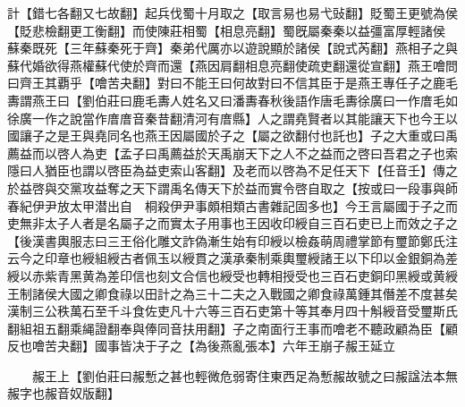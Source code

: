 計【錯七各翻又七故翻】起兵伐蜀十月取之【取言易也易弋䜴翻】貶蜀王更號為侯【貶悲檢翻更工衡翻】而使陳莊相蜀【相息亮翻】蜀旣屬秦秦以益彊富厚輕諸侯　蘇秦既死【三年蘇秦死于齊】秦弟代厲亦以遊說顯於諸侯【說式芮翻】燕相子之與蘇代婚欲得燕權蘇代使於齊而還【燕因肩翻相息亮翻使疏吏翻還從宣翻】燕王噲問曰齊王其覇乎【噲苦夬翻】對曰不能王曰何故對曰不信其臣于是燕王專任子之鹿毛夀謂燕王曰【劉伯莊曰鹿毛夀人姓名又曰潘夀春秋後語作唐毛夀徐廣曰一作庴毛如徐廣一作之說當作庴庴音秦昔翻清河有庴縣】人之謂堯賢者以其能讓天下也今王以國讓子之是王與堯同名也燕王因屬國於子之【屬之欲翻付也託也】子之大重或曰禹薦益而以啓人為吏【孟子曰禹薦益於天禹崩天下之人不之益而之啓曰吾君之子也索隱曰人猶臣也謂以啓臣為益吏索山客翻】及老而以啓為不足任天下【任音壬】傳之於益啓與交黨攻益奪之天下謂禹名傳天下於益而實令啓自取之【按或曰一段事與師春紀伊尹放太甲潜出自　桐殺伊尹事頗相類古書雜記固多也】今王言屬國于子之而吏無非太子人者是名屬子之而實太子用事也王因收印綬自三百石吏已上而效之子之【後漢書輿服志曰三王俗化雕文詐偽漸生始有印綬以檢姦萌周禮掌節有璽節鄭氏注云今之印章也綬組綬古者佩玉以綬貫之漢承秦制乘輿璽綬諸王以下印以金銀銅為差綬以赤紫青黑黄為差印信也刻文合信也綬受也轉相授受也三百石吏銅印黑綬或黄綬王制諸侯大國之卿食祿以田計之為三十二夫之入戰國之卿食祿萬鍾其僭差不度甚矣漢制三公秩萬石至千斗食佐吏凡十六等三百石吏第十等其奉月四十斛綬音受璽斯氏翻組祖五翻乘䋲證翻奉與俸同音扶用翻】子之南面行王事而噲老不聽政顧為臣【顧反也噲苦夬翻】國事皆决于子之【為後燕亂張本】六年王崩子赧王延立

　　赧王上【劉伯莊曰赧慙之甚也輕微危弱寄住東西足為慙赧故號之曰赧諡法本無赧字也赧音奴版翻】

